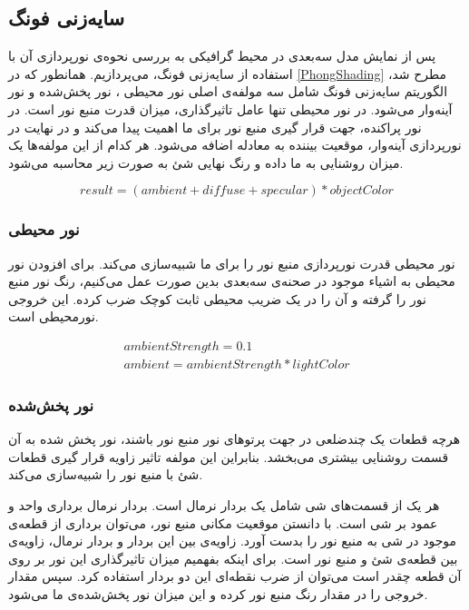 \subsection{سایه‌زنی فونگ}
پس از نمایش مدل سه‌‌بعدی در محیط گرافیکی به 
بررسی نحوه‌ی نورپردازی آن با استفاده از سایه‌‌زنی فونگ، می‌پردازیم.
همانطور که در 
\ref{PhongShading}
مطرح شد، الگوریتم سایه‌زنی فونگ شامل سه مولفه‌ی اصلی 
نور محیطی
، نور پخش‌شده
و نور آینه‌وار
می‌شود.
در نور محیطی تنها عامل تاثیرگذاری، میزان قدرت منبع نور است.
در نور پراکنده، جهت قرار گیری منبع نور برای ما اهمیت پیدا می‌کند و در نهایت 
در نورپردازی آینه‌وار، موقعیت بیننده به معادله اضافه می‌شود.
هر کدام از این مولفه‌ها یک میزان روشنایی به ما داده و 
رنگ نهایی شئ به صورت زیر محاسبه می‌شود.

\[ result = (ambient + diffuse + specular) * objectColor \]

\subsubsection{نور محیطی}
نور محیطی قدرت نورپردازی منبع نور را برای ما شبیه‌سازی می‌کند.
برای افزودن نور محیطی به اشیاء موجود در صحنه‌ی سه‌بعدی بدین صورت عمل 
می‌کنیم، رنگ نور منبع نور را گرفته و آن را در یک ضریب محیطی 
ثابت کوچک ضرب کرده. این خروجی نورمحیطی
است.

\begin{gather*}
	ambientStrength = 0.1 \\
	ambient = ambientStrength * lightColor
\end{gather*}


\subsubsection{نور پخش‌شده}

هرچه قطعات یک چندضلعی در جهت پرتو‌های نور منبع نور باشند، نور پخش شده 
به آن قسمت روشنایی بیشتری می‌بخشد.
بنابراین این مولفه تاثیر زاویه قرار گیری قطعات شئ با منبع نور را شبیه‌سازی می‌کند.

هر یک از قسمت‌های شی شامل یک بردار نرمال است. بردار نرمال برداری واحد و عمود بر شی است.
با دانستن موقعیت مکانی منبع نور، می‌‌توان برداری از قطعه‌ی موجود در شی 
به منبع نور را بدست آورد.
زاویه‌ی بین این بردار و بردار نرمال، زاویه‌ی بین قطعه‌ی شئ و منبع نور است.
برای اینکه بفهمیم میزان تاثیرگذاری این نور بر روی آن قطعه چقدر است می‌توان
از ضرب نقطه‌ای 
این دو بردار استفاده کرد.
سپس مقدار خروجی را در مقدار رنگ منبع نور کرده و این میزان نور پخش‌شده‌ی 
ما می‌شود.


